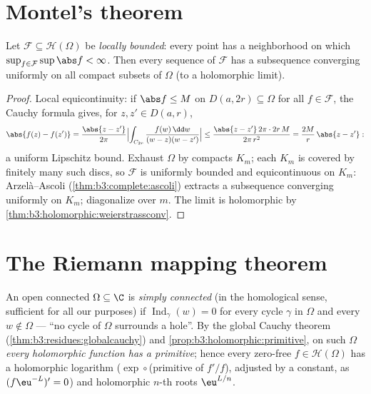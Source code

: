 \section{Montel's theorem}

\begin{theorem}[Montel]\label{thm:b3:conformal:montel}
Let $\mathcal F \subseteq \mathcal H(\Omega)$ be \emph{locally
bounded}: every point has a neighborhood on which $\sup_{f\in
\mathcal F}\sup\abs f < \infty$. Then every sequence of
$\mathcal F$ has a subsequence converging uniformly on all
compact subsets of $\Omega$ (to a holomorphic
limit).
\end{theorem}

\begin{proof}
Local equicontinuity: if $\abs f \leq M$ on $D(a, 2r)
\subseteq \Omega$ for all $f \in \mathcal F$, the Cauchy
formula gives, for $z, z' \in D(a, r)$,
\[
\abs{f(z) - f(z')} = \frac{\abs{z - z'}}{2\pi}
\Bigl|\int_{C_{2r}}\frac{f(w)\,\dd w}{(w-z)(w-z')}\Bigr|
\leq \frac{\abs{z - z'}\,2\pi\cdot2r\,M}{2\pi\,r^2}
= \frac{2M}{r}\,\abs{z - z'} :
\]
a uniform Lipschitz bound. Exhaust $\Omega$ by compacts $K_m$;
each $K_m$ is covered by finitely many such discs, so
$\mathcal F$ is uniformly bounded and equicontinuous on
$K_m$: Arzel\`a--Ascoli (\cref{thm:b3:complete:ascoli})
extracts a subsequence converging uniformly on $K_m$;
diagonalize over $m$. The limit is holomorphic by
\cref{thm:b3:holomorphic:weierstrassconv}.
\end{proof}

\section{The Riemann mapping theorem}

\begin{definition}\label{def:b3:conformal:simplyconnected}
An open connected $\Omega \subseteq \C$ is \emph{simply
connected} (in the homological
sense, sufficient for all our purposes) if
$\operatorname{Ind}_\gamma(w) = 0$ for every cycle $\gamma$ in
$\Omega$ and every $w \notin \Omega$ --- ``no cycle of
$\Omega$ surrounds a hole''. By the global Cauchy theorem
(\cref{thm:b3:residues:globalcauchy}) and
\cref{prop:b3:holomorphic:primitive}, on such $\Omega$
\emph{every holomorphic function has a primitive}; hence every
zero-free $f \in \mathcal H(\Omega)$ has a holomorphic
logarithm ($\exp\circ$(primitive of $f'/f$), adjusted by a
constant, as $(f\eu^{-L})' = 0$) and holomorphic $n$-th roots
$\eu^{L/n}$.
\end{definition}

